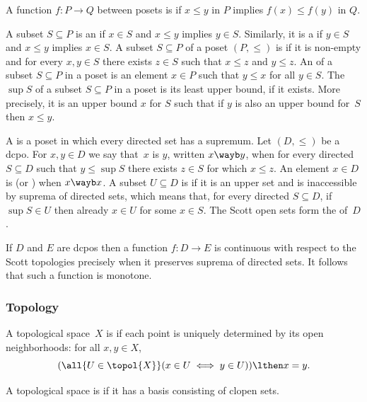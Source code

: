 A function $f : P \to Q$ between posets is  if $x \leq
y$ in $P$ implies $f(x) \leq f(y)$ in $Q$.

A subset $S \subseteq P$ is an  if $x \in S$ and $x
\leq y$ implies $y \in S$. Similarly, it is a  if $y
\in S$ and $x \leq y$ implies $x \in S$.
%
A subset $S \subseteq P$ of a poset $(P, {\leq})$ is 
if it is non-empty and for every $x, y \in S$ there exists $z \in S$
such that $x \leq z$ and $y \leq z$.
%
An  of a subset $S \subseteq P$ in a poset is an
element $x \in P$ such that $y \leq x$ for all $y \in S$.
%
The  $\sup S$ of a subset $S \subseteq P$ in a poset is
its least upper bound, if it exists. More precisely, it is an upper
bound $x$ for $S$ such that if $y$ is also an upper bound for~$S$ then
$x \leq y$.

A  is a poset in which
every directed set has a supremum. Let $(D, {\leq})$ be a dcpo. For
$x, y \in D$ we say that~$x$ is  $y$, written $x \wayb
y$, when for every directed $S \subseteq D$ such that $y \leq \sup S$
there exists $z \in S$ for which $x \leq z$. An element $x \in D$ is
 (or ) when $x \wayb x$. A subset $U
\subseteq D$ is  if it is an upper set and is
inaccessible by suprema of directed sets, which means that, for every
directed $S \subseteq D$, if $\sup S \in U$ then already $x \in U$ for
some $x \in S$. The Scott open sets form the 
of~$D$.

If $D$ and $E$ are dcpos then a function $f : D \to E$ is continuous
with respect to the Scott topologies precisely when it preserves
suprema of directed sets. It follows that such a function is monotone.


\subsubsection*{Topology}

A topological space~$X$ is  if each point is
uniquely determined by its open neighborhoods: for all $x, y \in
X$,
%
\begin{equation*}
  (\all{U \in \topol{X}} (x \in U \iff y \in U)) \lthen x = y.
\end{equation*}

A topological space is  if it has a basis
consisting of clopen sets.






